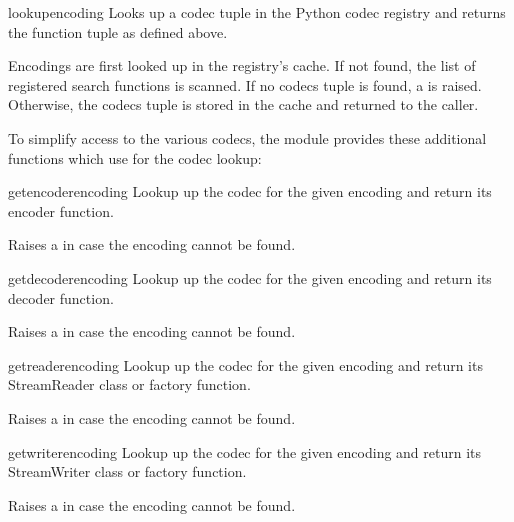 \begin{funcdesc}{lookup}{encoding}
Looks up a codec tuple in the Python codec registry and returns the
function tuple as defined above.

Encodings are first looked up in the registry's cache. If not found,
the list of registered search functions is scanned. If no codecs tuple
is found, a  is raised. Otherwise, the codecs
tuple is stored in the cache and returned to the caller.
\end{funcdesc}

To simplify access to the various codecs, the module provides these
additional functions which use  for the codec
lookup:

\begin{funcdesc}{getencoder}{encoding}
Lookup up the codec for the given encoding and return its encoder
function.

Raises a  in case the encoding cannot be found.
\end{funcdesc}

\begin{funcdesc}{getdecoder}{encoding}
Lookup up the codec for the given encoding and return its decoder
function.

Raises a  in case the encoding cannot be found.
\end{funcdesc}

\begin{funcdesc}{getreader}{encoding}
Lookup up the codec for the given encoding and return its StreamReader
class or factory function.

Raises a  in case the encoding cannot be found.
\end{funcdesc}

\begin{funcdesc}{getwriter}{encoding}
Lookup up the codec for the given encoding and return its StreamWriter
class or factory function.

Raises a  in case the encoding cannot be found.
\end{funcdesc}

